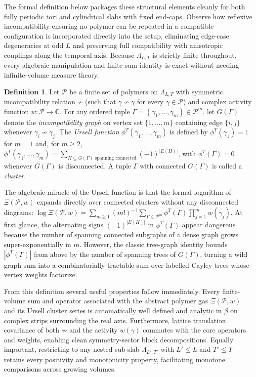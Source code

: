 \documentclass[11pt]{article}
\theoremstyle{definition}
\newtheorem{definition}[theorem]{Definition}
\begin{document}
The formal definition below packages these structural elements cleanly for both
fully periodic tori and cylindrical slabs with fixed end-caps. Observe how reflexive
incompatibility ensuring no polymer can be repeated in a compatible configuration is
incorporated directly into the setup, eliminating edge-case degeneracies at odd $L$
and preserving full compatibility with anisotropic couplings along the temporal
axis. Because $\Lambda_{L,T}$ is strictly finite throughout, every algebraic
manipulation and finite-sum identity is exact without needing infinite-volume
measure theory.

\begin{definition}
\label{def:s03-polymer}
Let $\mathcal{P}$ be a finite set of polymers on $\Lambda_{L,T}$ with symmetric
incompatibility relation $\not\sim$ (such that $\gamma \not\sim \gamma$ for every
$\gamma \in \mathcal{P}$) and complex activity function $w : \mathcal{P} \to
\mathbb{C}$. For any ordered tuple $\Gamma = (\gamma_1, \dots, \gamma_m) \in
\mathcal{P}^m$, let $G(\Gamma)$ denote the \emph{incompatibility graph} on vertex
set $\{1, \dots, m\}$ containing edge $\{i, j\}$ whenever $\gamma_i \not\sim
\gamma_j$. The \emph{Ursell function} $\phi^T(\gamma_1, \dots, \gamma_m)$ is defined
by $\phi^T(\gamma_1) = 1$ for $m = 1$ and, for $m \ge 2$, $\phi^T(\gamma_1, \dots,
\gamma_m) = \sum_{H \subseteq G(\Gamma) \text{ spanning connected}} (-1)^{|E(H)|}$,
with $\phi^T(\Gamma) = 0$ whenever $G(\Gamma)$ is disconnected. A tuple $\Gamma$
with connected $G(\Gamma)$ is called a \emph{cluster}.
\end{definition}

The algebraic miracle of the Ursell function is that the formal logarithm of
$\Xi(\mathcal{P}, w)$ expands directly over connected clusters without any
disconnected diagrams: $\log \Xi(\mathcal{P}, w) = \sum_{m \ge 1} (m!)^{-1}
\sum_{\Gamma \in \mathcal{P}^m} \phi^T(\Gamma) \prod_{j=1}^m w(\gamma_j)$. At first
glance, the alternating signs $(-1)^{|E(H)|}$ in $\phi^T(\Gamma)$ appear dangerous
because the number of spanning connected subgraphs of a dense graph grows
super-exponentially in $m$. However, the classic tree-graph identity bounds
$|\phi^T(\Gamma)|$ from above by the number of spanning trees of $G(\Gamma)$,
turning a wild graph sum into a combinatorially tractable sum over labelled Cayley
trees whose vertex weights factorize.

From this definition several useful properties follow immediately. Every
finite-volume sum and operator associated with the abstract polymer gas
$\Xi(\mathcal{P}, w)$ and its Ursell cluster series is automatically well defined
and analytic in $\beta$ on complex strips surrounding the real axis. Furthermore,
lattice translation covariance of both $\not\sim$ and the activity $w(\gamma)$
commutes with the core operators and weights, enabling clean symmetry-sector block
decompositions. Equally important, restricting to any nested sub-slab
$\Lambda_{L',T'}$ with $L' \le L$ and $T' \le T$ retains every positivity and
monotonicity property, facilitating monotone comparisons across growing volumes.
\end{document}

